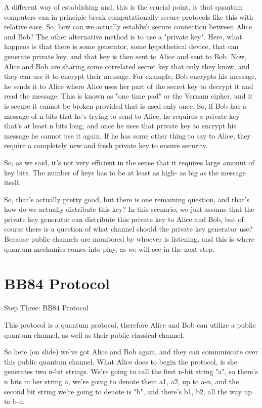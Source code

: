 A different way of establishing and, this is the crucial point, is that quantum computers can in principle break computationally secure protocols like this with relative ease. So, how can we actually establish secure connection between Alice and Bob? The other alternative method is to use a "private key". Here, what happens is that there is some generator, some hypothetical device, that can generate private key, and that key is then sent to Alice and sent to Bob. Now, Alice and Bob are sharing some correlated secret key that only they know, and they can use it to encrypt their message. For example, Bob encrypts his message, he sends it to Alice where Alice uses her part of the secret key to decrypt it and read the message. This is known as "one time pad" or the Vernam cipher, and it is secure it cannot be broken provided that is used only once. So, if Bob has a message of n bits that he's trying to send to Alice, he requires a private key that's at least n bits long, and once he uses that private key to encrypt his message he cannot use it again. If he has some other thing to say to Alice, they require a completely new and fresh private key to ensure security.

So, as we said, it's not very efficient in the sense that it requires large amount of key bits. The number of keys has to be at least as high- as big as the message itself.

So, that's actually pretty good, but there is one remaining question, and that's how do we actually distribute this key? In this scenario, we just assume that the private key generator can distribute this private key to Alice and Bob, but of course there is a question of what channel should the private key generator use? Because public channels are monitored by whoever is listening, and this is where quantum mechanics comes into play, as we will see in the next step.



\section{BB84 Protocol}

Step Three: BB84 Protocol

This protocol is a quantum protocol, therefore Alice and Bob can utilize a public quantum channel, as well as their public classical channel.

So here (on slide) we've got Alice and Bob again, and they can communicate over this public quantum channel. What Alice does to begin the protocol, is she generates two n-bit strings. We're going to call the first n-bit string "a", so there's n bits in her string a, we're going to denote them a1, a2, up to a-n, and the second bit string we're going to denote is "b", and there's b1, b2, all the way up to b-n.

